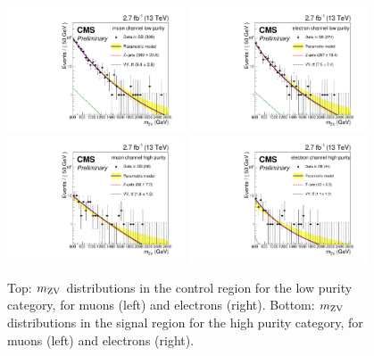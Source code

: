 \begin{figure}[p]
\centering
\includegraphics[width=0.47\textwidth]{figures/fits/mVZsbMLP.pdf}
\includegraphics[width=0.47\textwidth]{figures/fits/mVZsbELP.pdf}\newline
\includegraphics[width=0.47\textwidth]{figures/fits/mVZsbMHP.pdf}
\includegraphics[width=0.47\textwidth]{figures/fits/mVZsbEHP.pdf}\newline
\caption[Invariant mass distributions in control region]{
Top: $m_\mathrm{ZV}$ distributions in the control region for the low purity category,
for muons (left) and electrons (right). 
Bottom: $m_\mathrm{ZV}$ distributions in the signal region for the high purity category,
for muons (left) and electrons (right). 
}
\label{fig:control_MVZ}
\end{figure}

